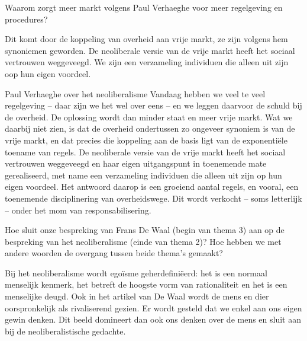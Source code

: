 \documentclass[main.tex]{subfiles}
\begin{document}
\begin{examenvraag}

    \begin{vraag}
        Waarom zorgt meer markt volgens Paul Verhaeghe voor meer regelgeving en procedures?
    \end{vraag}

    \begin{antwoord}
    Dit komt door de koppeling van overheid aan vrije markt, ze zijn volgens hem 
    synoniemen geworden. De neoliberale versie van de vrije markt heeft het 
    sociaal vertrouwen weggeveegd. We zijn een verzameling individuen die alleen 
    uit zijn oop hun eigen voordeel.
    \end{antwoord}
    
    \begin{citaat}{Paul Verhaeghe over het neoliberalisme}
	Vandaag hebben we veel te veel regelgeving – daar zijn we het wel
	over eens – en we leggen daarvoor de schuld bij de overheid. De oplossing 
	wordt dan minder staat en meer vrije markt. Wat we daarbij niet zien, is dat 	
	de overheid ondertussen zo ongeveer synoniem is van de vrije markt, en dat 
	precies die koppeling aan de basis ligt van de exponentiële toename van
	regels. De neoliberale versie van de vrije markt heeft het sociaal vertrouwen 
	weggeveegd en haar eigen uitgangspunt in toenemende mate gerealiseerd, met 
	name een verzameling individuen die alleen uit zijn op hun eigen voordeel. Het 
	antwoord daarop is een groeiend aantal regels, en vooral, een
	toenemende disciplinering van overheidswege. Dit wordt verkocht – soms
	letterlijk – onder het mom van responsabilisering.
    \end{citaat}
\end{examenvraag}


\begin{examenvraag}
    \begin{vraag}
        Hoe sluit onze bespreking van Frans De Waal (begin van thema 3) aan op de bespreking van het neoliberalisme (einde van thema 2)? Hoe hebben we met andere woorden de overgang tussen beide thema’s gemaakt?
    \end{vraag}

    \begin{antwoord}
    Bij het neoliberalisme wordt egoïsme geherdefiniëerd:‭ ‬het is een normaal menselijk kenmerk,‭ ‬het 
    betreft de hoogste vorm van rationaliteit en het is een menselijke deugd.‭ ‬Ook in het artikel 
    van De Waal wordt de mens en dier oorspronkelijk als rivaliserend gezien.‭ ‬Er wordt gesteld dat 
    we‭ ‬enkel aan ons eigen gewin denken.‭ ‬Dit‭ ‬beeld domineert dan ook ons denken over de mens en 
    sluit aan bij de neoliberalistische gedachte.
    \end{antwoord}
\end{examenvraag}
\end{document}
